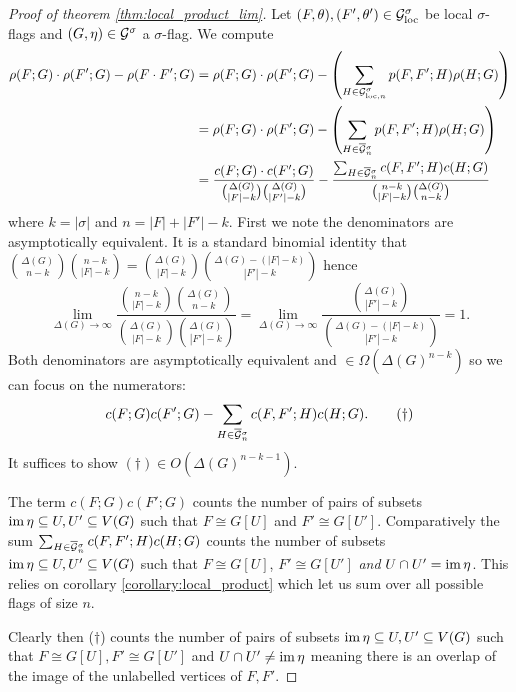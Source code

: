 \begin{proof}[Proof of theorem \ref{thm:local_product_lim}]
    Let $(F,\theta), (F',\theta') \in\mathcal{G}_\mathrm{loc}^\sigma$ be local $\sigma$-flags and
    $(G,\eta) \in \mathcal{G}^\sigma$ a
    $\sigma$-flag. We compute
    \[
        \begin{split}
            \rho(F; G)\cdot\rho(F';G) -\rho(F\cdot F'; G)
            &= \rho(F; G)\cdot\rho(F';G)
                - \left(\sum_{H\in\mathcal{G}_{\mathrm{loc},n}^\sigma} p(F, F'; H)\rho(H; G) \right)\\
            &= \rho(F; G)\cdot\rho(F';G)
                - \left(\sum_{H\in\overline{\mathcal{G}}{}_n^\sigma} p(F, F'; H)\rho(H; G) \right)\\
            &= \frac{c(F; G)\cdot c(F';G)}{\binom{\Delta(G)}{|F|-k}\binom{\Delta(G)}{|F'|-k}}
                - \frac{\sum_{H\in\overline{\mathcal{G}}{}^\sigma_n} c(F, F'; H)c(H; G)}
                {\binom{n-k}{|F|-k}\binom{\Delta(G)}{n-k}}
            \end{split}
    \]
    where $k=|\sigma|$ and $n=|F|+|F'|-k$.
    First we note the denominators are asymptotically equivalent. It is a standard
    binomial identity that
    $\binom{\Delta(G)}{n-k}\binom{n-k}{|F|-k} = \binom{\Delta(G)}{|F|-k}\binom{\Delta(G)-(|F|-k)}{|F'|-k}$
    hence
    \[
        \lim_{\Delta(G)\to\infty}
        \frac{\binom{n-k}{|F|-k}\binom{\Delta(G)}{n-k}}{\binom{\Delta(G)}{|F|-k}\binom{\Delta(G)}{|F'|-k}}
        = \lim_{\Delta(G)\to\infty}
        \frac{\binom{\Delta(G)}{|F'|-k}}{\binom{\Delta(G)-(|F|-k)}{|F'|-k}}
        = 1.
    \]
    Both denominators are asymptotically equivalent and $\in\Omega(\Delta(G)^{n-k})$ so we
    can focus on the numerators:
    \[
        c(F;G)c(F';G) - \sum_{H\in\overline{\mathcal{G}}{}^\sigma_n}c(F,F';H)c(H;G).
        \tag{$\dagger$}
    \]
    It suffices to show $(\dagger) \in O(\Delta(G)^{n-k-1})$.

    The term $c(F; G)c(F';G)$ counts the number of pairs of subsets
    $\operatorname{im}\eta \subseteq U, U' \subseteq V(G)$ such that $F \cong G[U]$ and $F'\cong G[U']$.
    Comparatively the sum $\sum_{H\in\overline{\mathcal{G}}{}^\sigma_n} c(F, F'; H)c(H; G)$ counts the number
    of subsets $\operatorname{im}\eta \subseteq U, U' \subseteq V(G)$ such that
    $F\cong G[U]$, $F'\cong G[U']$ \textit{and} $U \cap U' = \operatorname{im} \eta$. This relies on
    corollary \ref{corollary:local_product}
    which let us sum over all possible flags of size $n$.

    Clearly then ($\dagger$) counts the
    number of pairs of subsets $\operatorname{im}\eta \subseteq U, U' \subseteq V(G)$ such that
    $F \cong G[U], F'\cong G[U']$ and $U \cap U' \neq \operatorname{im} \eta$ meaning there is
    an overlap of the image of the unlabelled vertices of $F, F'$.


\end{proof}
